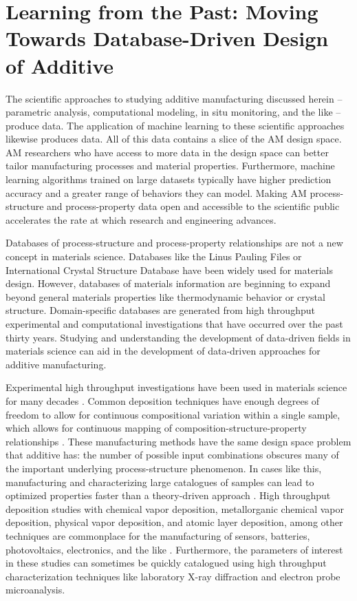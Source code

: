 \section{Learning from the Past: Moving Towards Database-Driven Design of Additive}
The scientific approaches to studying additive manufacturing discussed herein -- parametric analysis, computational modeling, in situ monitoring, and the like -- produce data. The application of machine learning to these scientific approaches likewise produces data. All of this data contains a slice of the AM design space. AM researchers who have access to more data in the design space can better tailor manufacturing processes and material properties. Furthermore, machine learning algorithms trained on large datasets typically have higher prediction accuracy and a greater range of behaviors they can model. Making AM process-structure and process-property data open and accessible to the scientific public accelerates the rate at which research and engineering advances.

Databases of process-structure and process-property relationships are not a new concept in materials science. Databases like the Linus Pauling Files or International Crystal Structure Database have been widely used for materials design. However, databases of materials information are beginning to expand beyond general materials properties like thermodynamic behavior or crystal structure. Domain-specific databases are generated from high throughput experimental and computational investigations that have occurred over the past thirty years. Studying and understanding the development of data-driven fields in materials science can aid in the development of data-driven approaches for additive manufacturing. 

Experimental high throughput investigations have been used in materials science for many decades \cite{Xiang1995}. Common deposition techniques have enough degrees of freedom to allow for continuous compositional variation within a single sample, which allows for continuous mapping of composition-structure-property relationships \cite{Long2007, Long2009, Kusne2015a}. These manufacturing methods have the same design space problem that additive has: the number of possible input combinations obscures many of the important underlying process-structure phenomenon. In cases like this, manufacturing and characterizing large catalogues of samples can lead to optimized properties faster than a theory-driven approach \cite{Ceder1998, Pilania2013}. High throughput deposition studies with chemical vapor deposition, metallorganic chemical vapor deposition, physical vapor deposition, and atomic layer deposition, among other techniques are commonplace for the manufacturing of sensors, batteries, photovoltaics, electronics, and the like \cite{Hampden-Smith1995, Gilmer1998, Mercey1999, Mitzi2001}. Furthermore, the parameters of interest in these studies can sometimes be quickly catalogued using high throughput characterization techniques like laboratory X-ray diffraction and electron probe microanalysis. 

